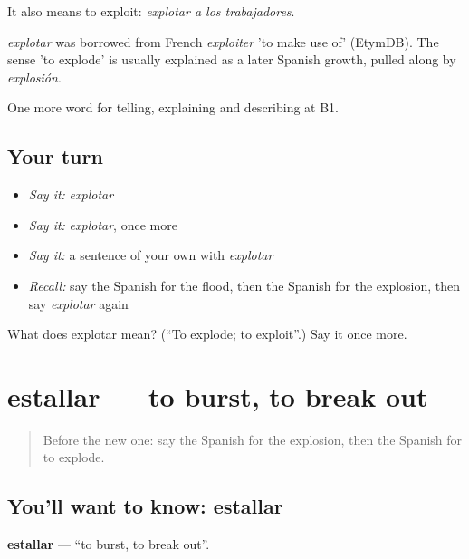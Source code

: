 It also means to exploit: \emph{explotar a los trabajadores}.

\begin{cousinweb}
\emph{explotar} was borrowed from French \emph{exploiter} 'to make use of' (EtymDB). The sense 'to explode' is usually explained as a later Spanish growth, pulled along by \emph{explosión}.
\end{cousinweb}

\begin{grammarlens}[title={What you've built}]
One more word for telling, explaining and describing at B1.
\end{grammarlens}

\subsection*{Your turn}
\begin{itemize}
\raggedright
  \item \emph{Say it:} \emph{explotar}
  \item \emph{Say it:} \emph{explotar}, once more
  \item \emph{Say it:} a sentence of your own with \emph{explotar}
  \item \emph{Recall:} say the Spanish for the flood, then the Spanish for the explosion, then say \emph{explotar} again
\end{itemize}

\begin{tcolorbox}[breakable,colback=teal!4,colframe=teal!35!black,title={Before you move on}]
What does explotar mean? (\textquotedblleft{}To explode; to exploit\textquotedblright{}.) Say it once more.
\end{tcolorbox}
\section[estallar]{estallar — to burst, to break out}

\label{lesson:ES-C529-estallar}



\begin{quote}
Before the new one: say the Spanish for the explosion, then the Spanish for to explode.
\end{quote}

\subsection*{You'll want to know: estallar}
\textbf{estallar} — \textquotedblleft{}to burst, to break out\textquotedblright{}.

